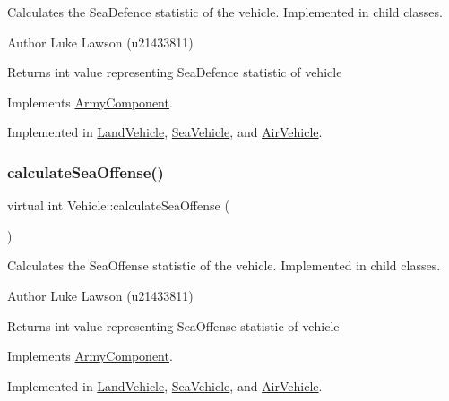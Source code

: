 Calculates the Sea\+Defence statistic of the vehicle. Implemented in child classes. 

\begin{DoxyAuthor}{Author}
Luke Lawson (u21433811) 
\end{DoxyAuthor}
\begin{DoxyReturn}{Returns}
int value representing Sea\+Defence statistic of vehicle 
\end{DoxyReturn}


Implements \mbox{\hyperlink{class_army_component_af5656dd9c12738ec90ea7886fd7ee34a}{Army\+Component}}.



Implemented in \mbox{\hyperlink{class_land_vehicle_a5a07a90d8307b0ac44e2caacb84eb64e}{Land\+Vehicle}}, \mbox{\hyperlink{class_sea_vehicle_aeca10ceffca2683364af15e67e666281}{Sea\+Vehicle}}, and \mbox{\hyperlink{class_air_vehicle_a6a0912049937756912347a75cbd74c1b}{Air\+Vehicle}}.

\mbox{\label{class_vehicle_ab70b8c0eef30b37648a1ab9903043f47}} 
\subsubsection{\texorpdfstring{calculateSeaOffense()}{calculateSeaOffense()}}
{\footnotesize\ttfamily virtual int Vehicle\+::calculate\+Sea\+Offense (\begin{DoxyParamCaption}{ }\end{DoxyParamCaption})\hspace{0.3cm}{\ttfamily [pure virtual]}}



Calculates the Sea\+Offense statistic of the vehicle. Implemented in child classes. 

\begin{DoxyAuthor}{Author}
Luke Lawson (u21433811) 
\end{DoxyAuthor}
\begin{DoxyReturn}{Returns}
int value representing Sea\+Offense statistic of vehicle 
\end{DoxyReturn}


Implements \mbox{\hyperlink{class_army_component_a6e29f65ac92c18a82bf4a6a06d6d4457}{Army\+Component}}.



Implemented in \mbox{\hyperlink{class_land_vehicle_a679b1e2f608cdfad427449240a504999}{Land\+Vehicle}}, \mbox{\hyperlink{class_sea_vehicle_a0b7105037f612389b5af8471801ecee0}{Sea\+Vehicle}}, and \mbox{\hyperlink{class_air_vehicle_ad79fc5014baa403de34c435d3c2c14d0}{Air\+Vehicle}}.



